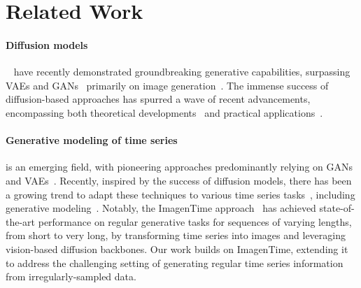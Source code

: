 \documentclass{article}
\theoremstyle{plain}
\theoremstyle{definition}
\theoremstyle{remark}
\begin{document}
\vspace{-3mm}
\section{Related Work}
\label{sec:related}
\vspace{-2mm}

\paragraph{Diffusion models}\hspace{-3.5mm}~\cite{sohl2015deep} have recently demonstrated groundbreaking generative capabilities, surpassing VAEs and GANs~\cite{kingma2014auto,goodfellow2014generative} primarily on image generation~\cite{ho2020denoising, dhariwal2021diffusion, rombach2022high}. The immense success of diffusion-based approaches has spurred a wave of recent advancements, encompassing both theoretical developments~\cite{song2021score, lipman2023flow} and practical applications~\cite{lugmayr2022repaint, ho2022video, kreuk2023audiogen, berman2025reviving, berman2025one, berman2025towards}.
\vspace{-2mm}

\paragraph{Generative modeling of time series}\hspace{-3mm} is an emerging field, with pioneering approaches predominantly relying on GANs~\cite{yoon2019time, liao2020conditional, li2022tts} and VAEs~\cite{desai2021timevae, naiman2024generative}. Recently, inspired by the success of diffusion models, there has been a growing trend to adapt these techniques to various time series tasks~\cite{tashiro2021csdi, rasul2021autoregressive}, including generative modeling~\cite{coletta2023constrained, yuan2024diffusion, gonen2025time}. Notably, the ImagenTime approach~\cite{naiman2024utilizing} has achieved state-of-the-art performance on regular generative tasks for sequences of varying lengths, from short to very long, by transforming time series into images and leveraging vision-based diffusion backbones. Our work builds on ImagenTime, extending it to address the challenging setting of generating regular time series information from irregularly-sampled data.
\vspace{-2mm}

\end{document}
